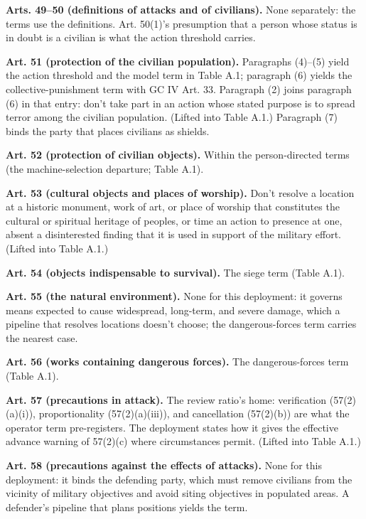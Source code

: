 \textbf{Arts. 49–50 (definitions of attacks and of civilians).} None separately: the terms use the definitions. Art. 50(1)'s presumption that a person whose status is in doubt is a civilian is what the action threshold carries.

\textbf{Art. 51 (protection of the civilian population).} Paragraphs (4)–(5) yield the action threshold and the model term in Table A.1; paragraph (6) yields the collective-punishment term with GC IV Art. 33. Paragraph (2) joins paragraph (6) in that entry: don't take part in an action whose stated purpose is to spread terror among the civilian population. (Lifted into Table A.1.) Paragraph (7) binds the party that places civilians as shields.

\textbf{Art. 52 (protection of civilian objects).} Within the person-directed terms (the machine-selection departure; Table A.1).

\textbf{Art. 53 (cultural objects and places of worship).} Don't resolve a location at a historic monument, work of art, or place of worship that constitutes the cultural or spiritual heritage of peoples, or time an action to presence at one, absent a disinterested finding that it is used in support of the military effort. (Lifted into Table A.1.)

\textbf{Art. 54 (objects indispensable to survival).} The siege term (Table A.1).

\textbf{Art. 55 (the natural environment).} None for this deployment: it governs means expected to cause widespread, long-term, and severe damage, which a pipeline that resolves locations doesn't choose; the dangerous-forces term carries the nearest case.

\textbf{Art. 56 (works containing dangerous forces).} The dangerous-forces term (Table A.1).

\textbf{Art. 57 (precautions in attack).} The review ratio's home: verification (57(2)(a)(i)), proportionality (57(2)(a)(iii)), and cancellation (57(2)(b)) are what the operator term pre-registers. The deployment states how it gives the effective advance warning of 57(2)(c) where circumstances permit. (Lifted into Table A.1.)

\textbf{Art. 58 (precautions against the effects of attacks).} None for this deployment: it binds the defending party, which must remove civilians from the vicinity of military objectives and avoid siting objectives in populated areas. A defender's pipeline that plans positions yields the term.

